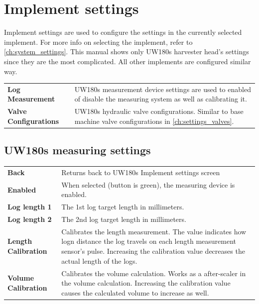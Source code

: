 \documentclass[12pt,a4paper,english]{uvmanual}
\begin{document}
\section{Implement settings}\label{ch:settings_implement}

Implement settings are used to configure the settings in the currently selected implement. For more info on selecting the implement, refer to \autoref{ch:system_settings}. This manual shows only UW180s harvester head's settings since they are the most complicated. All other implements are configured similar way.


\begin{tabular}{ L{0.2\textwidth} L{0.66\textwidth} }
\textbf{Log Measurement} & UW180s measurement device settings are used to enabled of disable the measuring system as well as calibrating it. \\
\textbf{Valve Configurations} & UW180s hydraulic valve configurations. Similar to base machine valve configurations in \autoref{ch:settings_valves}. \\
\end{tabular}

\FloatBarrier
\subsection{UW180s measuring settings}\label{ch:settings_uw180s_meas}


\begin{tabular}{ L{0.2\textwidth} L{0.66\textwidth} }
\textbf{Back} & Returns back to UW180s Implement settings screen \\
\textbf{Enabled} & When selected (button is green), the measuring device is enabled. \\
\textbf{Log length 1} & The 1st log target length in millimeters. \\
\textbf{Log length 2} & The 2nd log target length in millimeters. \\
\textbf{Length Calibration} & Calibrates the length measurement. The value indicates how logn distance the log travels on each length measurement sensor's pulse. Increasing the calibration value decreases the actual length of the logs. \\
\textbf{Volume Calibration} & Calibrates the volume calculation. Works as a after-scaler in the volume calculation. Increasing the calibration value causes the calculated volume to increase as well. \\
\end{tabular}
\end{document}
